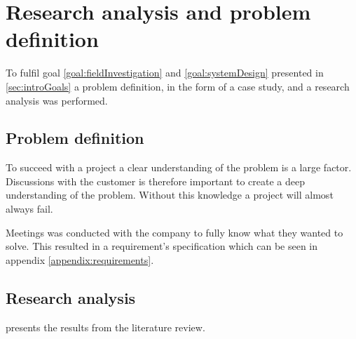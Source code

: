 \section{Research analysis and problem definition}\label{sec:methodProblemDefinitionResAnalysis}
To fulfil goal \ref{goal:fieldInvestigation} and \ref{goal:systemDesign} presented in \cref{sec:introGoals} a problem definition, in the form of a case study, and a research analysis was performed.

\subsection{Problem definition}\label{sec:methodProblemDefinition}
To succeed with a project a clear understanding of the problem is a large factor.
Discussions with the customer is therefore important to create a deep understanding of the problem.
Without this knowledge a project will almost always fail.
\cite{SecretsSuccessfulSimulation1995}

\bigskip

Meetings was conducted with the company to fully know what they wanted to solve.
This resulted in a requirement's specification which can be seen in appendix \ref{appendix:requirements}.

\subsection{Research analysis}\label{sec:methodResearchAnalysis}
 presents the results from the literature review.
